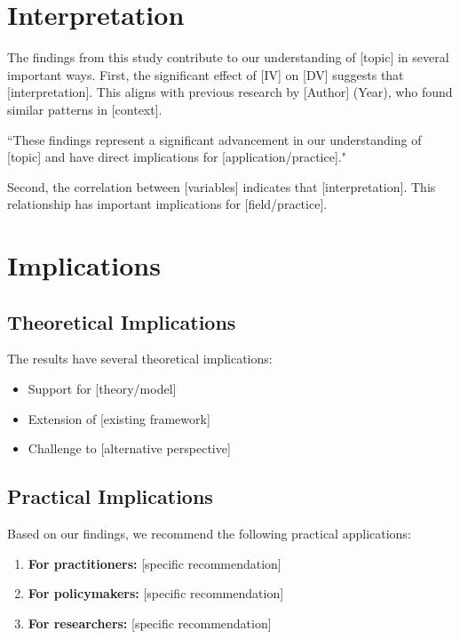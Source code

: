 \documentclass[11pt,letterpaper]{report}
\begin{document}
\section{Interpretation}

The findings from this study contribute to our understanding of [topic] in several important ways. First, the significant effect of [IV] on [DV] suggests that [interpretation]. This aligns with previous research by [Author] (Year), who found similar patterns in [context].

\begin{pullquote}
``These findings represent a significant advancement in our understanding of [topic] and have direct implications for [application/practice]."
\end{pullquote}

Second, the correlation between [variables] indicates that [interpretation]. This relationship has important implications for [field/practice].

\section{Implications}

\subsection{Theoretical Implications}

The results have several theoretical implications:

\begin{itemize}
    \item Support for [theory/model]
    \item Extension of [existing framework]
    \item Challenge to [alternative perspective]
\end{itemize}

\subsection{Practical Implications}

\begin{recommendations}
Based on our findings, we recommend the following practical applications:
\begin{enumerate}
    \item \textbf{For practitioners:} [specific recommendation]
    \item \textbf{For policymakers:} [specific recommendation]
    \item \textbf{For researchers:} [specific recommendation]
\end{enumerate}
\end{recommendations}
\end{document}
